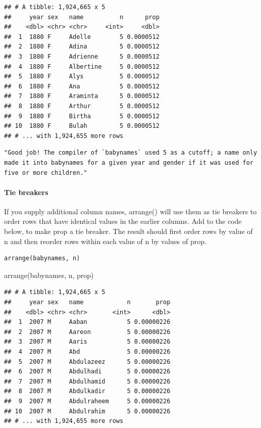 \documentclass[
]{article}
\newenvironment{Shaded}{\begin{snugshade}}{\end{snugshade}}
\newcommand{\FunctionTok}[1]{\textcolor[rgb]{0.00,0.00,0.00}{#1}}
\newcommand{\NormalTok}[1]{#1}
\begin{document}
\begin{verbatim}
## # A tibble: 1,924,665 x 5
##     year sex   name          n      prop
##    <dbl> <chr> <chr>     <int>     <dbl>
##  1  1880 F     Adelle        5 0.0000512
##  2  1880 F     Adina         5 0.0000512
##  3  1880 F     Adrienne      5 0.0000512
##  4  1880 F     Albertine     5 0.0000512
##  5  1880 F     Alys          5 0.0000512
##  6  1880 F     Ana           5 0.0000512
##  7  1880 F     Araminta      5 0.0000512
##  8  1880 F     Arthur        5 0.0000512
##  9  1880 F     Birtha        5 0.0000512
## 10  1880 F     Bulah         5 0.0000512
## # ... with 1,924,655 more rows
\end{verbatim}

\begin{verbatim}
"Good job! The compiler of `babynames` used 5 as a cutoff; a name only made it into babynames for a given year and gender if it was used for five or more children."
\end{verbatim}

\hypertarget{tie-breakers}{%
\paragraph{Tie breakers}\label{tie-breakers}}

If you supply additional column names, arrange() will use them as tie
breakers to order rows that have identical values in the earlier
columns. Add to the code below, to make prop a tie breaker. The result
should first order rows by value of n and then reorder rows within each
value of n by values of prop.

\begin{verbatim}
arrange(babynames, n)
\end{verbatim}

\begin{Shaded}
\begin{Highlighting}[]
\FunctionTok{arrange}\NormalTok{(babynames, n, prop)}
\end{Highlighting}
\end{Shaded}

\begin{verbatim}
## # A tibble: 1,924,665 x 5
##     year sex   name            n       prop
##    <dbl> <chr> <chr>       <int>      <dbl>
##  1  2007 M     Aaban           5 0.00000226
##  2  2007 M     Aareon          5 0.00000226
##  3  2007 M     Aaris           5 0.00000226
##  4  2007 M     Abd             5 0.00000226
##  5  2007 M     Abdulazeez      5 0.00000226
##  6  2007 M     Abdulhadi       5 0.00000226
##  7  2007 M     Abdulhamid      5 0.00000226
##  8  2007 M     Abdulkadir      5 0.00000226
##  9  2007 M     Abdulraheem     5 0.00000226
## 10  2007 M     Abdulrahim      5 0.00000226
## # ... with 1,924,655 more rows
\end{verbatim}
\end{document}
